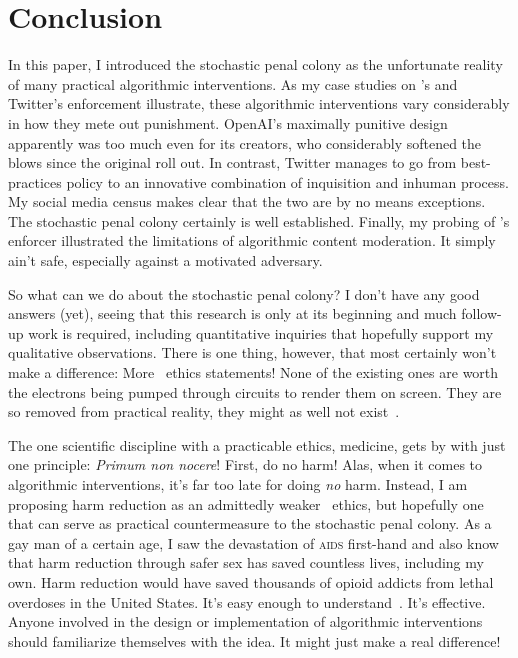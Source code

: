 \section{Conclusion}
\label{sec:conclusion}

In this paper, I introduced the stochastic penal colony as the unfortunate
reality of many practical algorithmic interventions. As my case studies on
\DALLE's and Twitter's enforcement illustrate, these algorithmic interventions
vary considerably in how they mete out punishment. OpenAI's maximally punitive
design apparently was too much even for its creators, who considerably softened
the blows since the original roll out. In contrast, Twitter manages to go from
best-practices policy to an innovative combination of inquisition and inhuman
process. My social media census makes clear that the two are by no means
exceptions. The stochastic penal colony certainly is well established. Finally,
my probing of \DALLE's enforcer illustrated the limitations of algorithmic
content moderation. It simply ain't safe, especially against a motivated
adversary.

So what can we do about the stochastic penal colony? I don't have any good
answers (yet), seeing that this research is only at its beginning and much
follow-up work is required, including quantitative inquiries that hopefully
support my qualitative observations. There is one thing, however, that most
certainly won't make a difference: More \AI\ ethics statements! None of the
existing ones are worth the electrons being pumped through circuits to render
them on screen. They are so removed from practical reality, they might as well
not exist~\cite{Hagendorff2022,Munn2022,WhittlestoneNyrupea2019}.

The one scientific discipline with a practicable ethics, medicine, gets by with
just one principle: \emph{Primum non nocere}! First, do no harm! Alas, when it
comes to algorithmic interventions, it's far too late for doing \emph{no} harm.
Instead, I am proposing harm reduction as an admittedly weaker \AI\ ethics, but
hopefully one that can serve as practical countermeasure to the stochastic penal
colony. As a gay man of a certain age, I saw the devastation of \textsc{aids}
first-hand and also know that harm reduction through safer sex has saved
countless lives, including my own. Harm reduction would have saved thousands of
opioid addicts from lethal overdoses in the United States. It's easy enough to
understand~\cite{HRI2020,HRI2022,Interlandi2023,MarlattLarimerea2011,OpenSocietyFoundations2021}.
It's effective. Anyone involved in the design or implementation of algorithmic
interventions should familiarize themselves with the idea. It might just make a
real difference!
